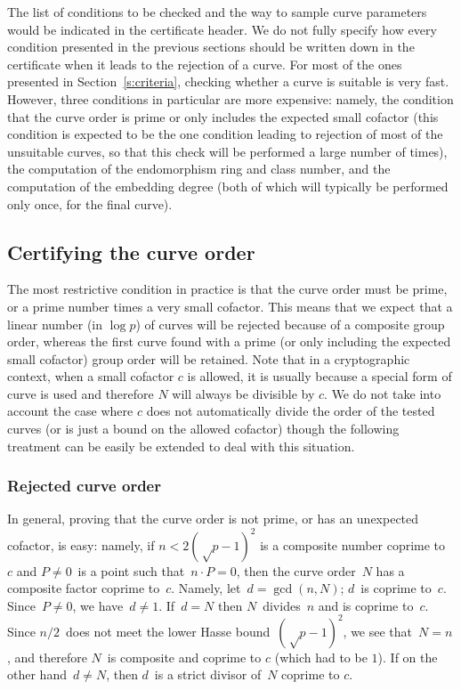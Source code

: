 \documentclass[twocolumn,letterpaper,10pt]{article}
\begin{document}
The list of conditions to be checked and the way to sample
curve parameters would be indicated in the certificate header.
We do not fully specify how every condition presented
in the previous sections should be written down in the
certificate when it leads to the rejection of a curve.
For most of the ones presented in Section~\ref{s:criteria},
checking whether a curve is suitable is very fast.
However, three conditions in particular are more expensive:
namely, the condition that the curve order is prime or
only includes the expected small cofactor
(this condition is expected to be the one condition
leading to rejection of most of the unsuitable curves,
so that this check will be performed a large number of times),
the computation of the endomorphism ring and class number,
and the computation of the embedding degree
(both of which will typically be performed only once, for the final curve).

\subsection{Certifying the curve order}

The most restrictive condition in practice is that
the curve order must be prime, or a prime number
times a very small cofactor.
This means that we expect that a linear number (in $\log p$)
of curves will be rejected because of a composite group order,
whereas the first curve found with a prime
(or only including the expected small cofactor)
group order will be retained.
Note that in a cryptographic context,
when a small cofactor $c$ is allowed,
it is usually because a special form of curve is used
and therefore $N$ will always be divisible by $c$.
We do not take into account the case where $c$ does not automatically
divide the order of the tested curves
(or is just a bound on the allowed cofactor)
though the following treatment can be easily be extended
to deal with this situation.

\subsubsection{Rejected curve order}

In general, proving that the curve order
is not prime, or has an unexpected cofactor, is easy:
namely, if $n < 2 (√p-1)^2$ is a composite number coprime to~$c$
and $P ≠ 0$~is a point such that~$n · P = 0$,
then the curve order~$N$ has a composite factor coprime to~$c$.
Namely, let~$d = \gcd (n, N)$; $d$~is coprime to~$c$.
Since~$P≠0$, we have~$d≠1$.
If~$d = N$ then $N$~divides~$n$ and is coprime to~$c$.
Since $n/2$~does not meet the lower Hasse bound~$(√p-1)^2$,
we see that~$N = n$, and therefore $N$~is composite
and coprime to $c$ (which had to be $1$).
If on the other hand~$d ≠ N$, then $d$~is a strict divisor of~$N$
coprime to $c$.
\end{document}
